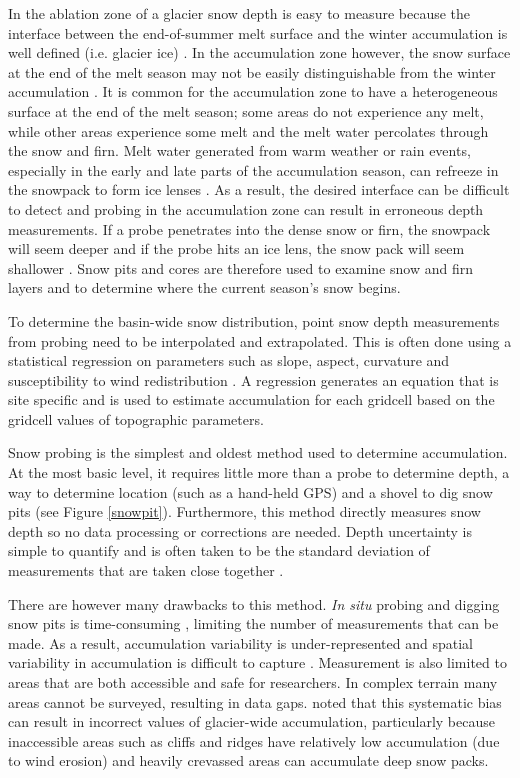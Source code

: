 \documentclass{sfuthesis}
\begin{document}
In the ablation zone of a glacier snow depth is easy to measure because the interface between the end-of-summer melt surface and the winter accumulation is well defined (i.e. glacier ice) \citep{McGrath2015}. In the accumulation zone however, the snow surface at the end of the melt season may not be easily distinguishable from the winter accumulation \citep{Grunewald2010}. It is common for the accumulation zone to have a heterogeneous surface at the end of the melt season; some areas do not experience any melt, while other areas experience some melt and the melt water percolates through the snow and firn. Melt water generated from warm weather or rain events, especially in the early and late parts of the accumulation season, can refreeze in the snowpack to form ice lenses \citep{Sold2014}. As a result, the desired interface can be difficult to detect and probing in the accumulation zone can result in erroneous depth measurements. If a probe penetrates into the dense snow or firn, the snowpack will seem deeper and if the probe hits an ice lens, the snow pack will seem shallower \citep{Sold2013}. Snow pits and cores are therefore used to examine snow and firn layers and to determine where the current season's snow begins.

To determine the basin-wide snow distribution, point snow depth measurements from probing need to be interpolated and extrapolated. This is often done using a statistical regression on parameters such as slope, aspect, curvature and susceptibility to wind redistribution \citep[e.g.][]{Wheler2014,McGrath2015}. A regression generates an equation that is site specific and is used to estimate accumulation for each gridcell based on the gridcell values of topographic parameters. 

Snow probing is the simplest and oldest method used to determine accumulation. At the most basic level, it requires little more than a probe to determine depth, a way to determine location (such as a hand-held GPS) and a shovel to dig snow pits (see Figure \ref{snowpit}). Furthermore, this method directly measures snow depth so no data processing or corrections are needed. Depth uncertainty is simple to quantify and is often taken to be the standard deviation of measurements that are taken close together \citep{Sold2013}. 

There are however many drawbacks to this method. \textit{In situ} probing and digging snow pits is time-consuming \citep{Deems2006}, limiting the number of measurements that can be made. As a result, accumulation variability is under-represented and spatial variability in accumulation is difficult to capture \citep{Sold2014}. Measurement is also limited to areas that are both accessible and safe for researchers. In complex terrain many areas cannot be surveyed, resulting in data gaps. \cite{Sold2013} noted that this systematic bias can result in incorrect values of glacier-wide accumulation, particularly because inaccessible areas such as cliffs and ridges have relatively low accumulation (due to wind erosion) and heavily crevassed areas can accumulate deep snow packs. 
\end{document}
